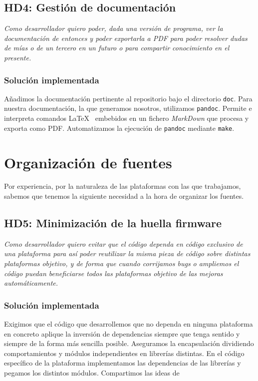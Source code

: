 \subsection{HD4: Gestión de documentación}

\textit{Como desarrollador quiero poder, dada una versión de programa,
ver la documentación de entonces y poder exportarla a PDF para
poder resolver dudas de mías o de un tercero en un futuro o
para compartir conocimiento en el presente.}

\subsubsection{Solución implementada}

Añadimos la documentación pertinente al repositorio bajo el directorio
\texttt{doc}. Para nuestra documentación, la que generamos nosotros,
utilizamos \texttt{pandoc}. Permite e interpreta comandos \LaTeX
\ embebidos en un fichero \textit{MarkDown} que procesa y exporta como PDF.
Automatizamos la ejecución de \texttt{pandoc} mediante \texttt{make}.

\section{Organización de fuentes}

Por experiencia, por la naturaleza de las plataformas con las que
trabajamos, sabemos que tenemos la siguiente necesidad a la hora
de organizar los fuentes.

\subsection{HD5: Minimización de la huella firmware}

\textit{Como desarrollador quiero evitar que el código dependa en
código exclusivo de una plataforma para así poder reutilizar
la misma pieza de código sobre distintas plataformas objetivo, y de forma
que cuando corrijamos bugs o ampliemos el código puedan beneficiarse
todos las plataformas objetivo de las mejoras automáticamente.}

\subsubsection{Solución implementada}

Exigimos que el código que desarrollemos que no dependa en ninguna
plataforma en concreto aplique la inversión de dependencias siempre
que tenga sentido y siempre de la forma más sencilla posible. Aseguramos la
encapsulación dividiendo comportamientos y módulos independientes
en librerías distintas. En el código específico de la plataforma
implementamos las dependencias de las librerías y pegamos los distintos
módulos. Compartimos las ideas de \cite[Modularity: Glue Layers]{ArtOfUnixProgramming}

